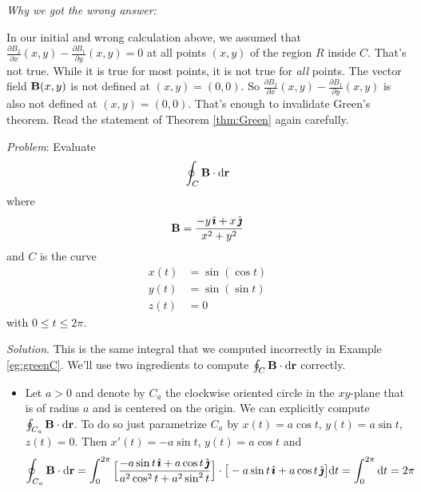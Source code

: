 \begin{eg}
\medskip
\noindent
\emph{Why we got the wrong answer:}

\noindent
In our initial and wrong calculation above, we assumed that 
$\frac{\partial B_2}{\partial x}(x,y) 
                - \frac{\partial B_1}{\partial y}(x,y)=0$
at all points $(x,y)$ of the region $R$ inside $C$. That's not true.
While it is true for most points, it is not true for  \emph{all} points.
The vector field $\mathbf{B}(x,y)$ is not defined at $(x,y)=(0,0)$.
So $\frac{\partial B_2}{\partial x}(x,y) 
                - \frac{\partial B_1}{\partial y}(x,y)$
is also not defined at $(x,y)=(0,0)$. That's enough to invalidate
Green's theorem. Read the statement of Theorem \ref{thm:Green} again carefully.

\end{eg}

\begin{eg}\label{eg:greenCC}
\noindent\textit{Problem}:
Evaluate
\begin{equation*}
\oint_C\mathbf{B}\cdot\mathrm{d}\mathbf{r}
\end{equation*}
where
\begin{equation*}
\mathbf{B} = \frac{-y\,\hat{\pmb{\imath}}+x\,\hat{\pmb{\jmath}}}{x^2+y^2}
\end{equation*}
and $C$ is the curve
\begin{align*}
x(t) &= \sin(\cos t) \\
y(t) &= \sin(\sin t) \\
z(t) &= 0
\end{align*}
with $0\le t\le 2\pi$.

\medskip
\noindent\textit{Solution}.
This is the same integral that we computed incorrectly in Example
 \ref{eg:greenC}.
We'll use two ingredients to compute $\oint_C\mathbf{B}\cdot\mathrm{d}\mathbf{r}$
correctly.

\begin{itemize}\itemsep1pt \parskip0pt  %
\item
Let $a>0$ and denote by $C_a$ the clockwise oriented circle in 
the $xy$-plane that is of radius $a$ and is centered on the origin. 
We can explicitly compute
$\oint_{C_a}\mathbf{B}\cdot\mathrm{d}\mathbf{r}$. To do so just parametrize 
$C_a$ by $x(t)=a\cos t$, $y(t) = a\sin t$, $z(t)=0$. Then
$x'(t)=-a\sin t$, $y(t) = a\cos t$ and
\begin{align*}
\oint_{C_a}\mathbf{B}\cdot\mathrm{d}\mathbf{r}
&=\int_0^{2\pi}\Big[\frac{-a\sin t\,\hat{\pmb{\imath}}+a\cos t\,\hat{\pmb{\jmath}}}
                            {a^2\cos^2t+a^2\sin^2t}\Big]
           \cdot\big[-a\sin t\,\hat{\pmb{\imath}}+a\cos t\,\hat{\pmb{\jmath}}\big]
           \mathrm{d}t
=\int_0^{2\pi}\mathrm{d}t=2\pi
\end{align*}


\end{itemize}
\end{eg}
